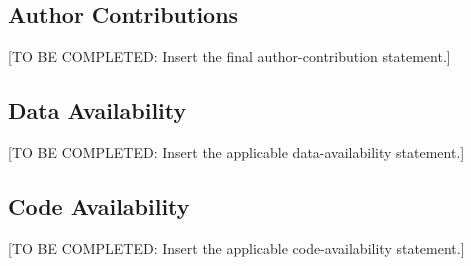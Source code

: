 \documentclass[pdflatex,sn-mathphys-num,iicol]{sn-jnl}
\begin{document}
\subsection*{Author Contributions}
[TO BE COMPLETED: Insert the final author-contribution statement.]

\subsection*{Data Availability}
[TO BE COMPLETED: Insert the applicable data-availability statement.]

\subsection*{Code Availability}
[TO BE COMPLETED: Insert the applicable code-availability statement.]

%
%
%

%

%


\end{document}
